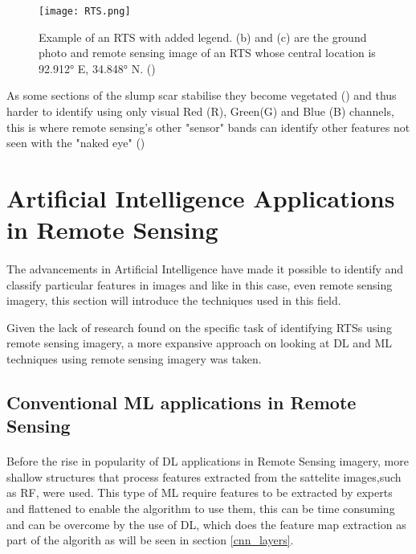     \begin{figure}[hbt!]
        \centering
        \texttt{[image: RTS.png]}
        \caption{Example of an \gls{RTS} with added legend. (b) and (c) are the
ground photo and remote sensing image of an \gls{RTS} whose central location is 92.912° E, 34.848° N. (\cite{HUANG2020111534})}
        \label{fig_RTS}
    \end{figure}


As some sections of the slump scar stabilise they become vegetated (\cite{KOKELJ201556}) and thus harder to identify using only visual Red (R), Green(G) and Blue (B) channels, this is where remote sensing's other "sensor" bands can identify other features not seen with the "naked eye" (\cite{HUANG2020111534})
\section{Artificial Intelligence Applications in Remote Sensing}  \label{ai_rs}
\paragraph{}
The advancements in Artificial Intelligence have made it possible to identify and classify particular features in images and like in this case, even remote sensing imagery, this section will introduce the techniques used in this field.

Given the lack of research found on the specific task of identifying \gls{RTS}s using remote sensing imagery, a more expansive approach on looking at \gls{DL} and \gls{ML} techniques using remote sensing imagery was taken.

\subsection{Conventional \gls{ML} applications in Remote Sensing}  \label{ml_rs}
\paragraph{}
Before the rise in popularity of \gls{DL} applications in Remote Sensing imagery, more shallow structures that process features extracted from the sattelite images,such as \gls{RF}, were used. This type of \gls{ML} require features to be extracted by experts and flattened to enable the algorithm to use them, this can be time consuming and can be overcome by the use of \gls{DL}, which does the feature map extraction as part of the algorith as will be seen in section \ref{cnn_layers}.

